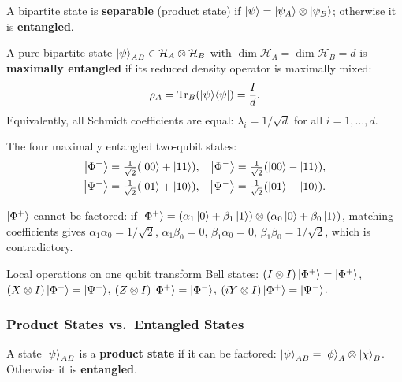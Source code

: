 \documentclass[10pt,a4paper]{article}
\begin{document}
\begin{tcolorbox}[defstyle, title={Definition: Separable and Entangled States}]
A bipartite state is \textbf{separable} (product state) if $\ket{\psi}=\ket{\psi_A}\otimes\ket{\psi_B}$; otherwise it is \textbf{entangled}.
\end{tcolorbox}

\begin{tcolorbox}[defstyle, title={Definition: Maximally Entangled State}]
A pure bipartite state $\ket{\psi}_{AB}\in\mathcal{H}_A\otimes\mathcal{H}_B$ with $\dim\mathcal{H}_A=\dim\mathcal{H}_B=d$ is \textbf{maximally entangled} if its reduced density operator is maximally mixed:
\[
\rho_A = \mathrm{Tr}_B\!\left(\ket{\psi}\!\bra{\psi}\right) = \frac{I}{d}.
\]
Equivalently, all Schmidt coefficients are equal: $\lambda_i=1/\sqrt{d}$ for all $i=1,\dots,d$.
\end{tcolorbox}

\begin{tcolorbox}[defstyle, title={Definition: Bell States (EPR Pairs)}]
The four maximally entangled two-qubit states:
\begin{align*}
\ket{\Phi^+}&=\tfrac{1}{\sqrt{2}}(\ket{00}+\ket{11}), & \ket{\Phi^-}&=\tfrac{1}{\sqrt{2}}(\ket{00}-\ket{11}),\\
\ket{\Psi^+}&=\tfrac{1}{\sqrt{2}}(\ket{01}+\ket{10}), & \ket{\Psi^-}&=\tfrac{1}{\sqrt{2}}(\ket{01}-\ket{10}).
\end{align*}
\end{tcolorbox}
$\ket{\Phi^+}$ cannot be factored: if $\ket{\Phi^+}=(\alpha_1\ket{0}+\beta_1\ket{1})\otimes(\alpha_0\ket{0}+\beta_0\ket{1})$, matching coefficients gives $\alpha_1\alpha_0=1/\sqrt{2}$, $\alpha_1\beta_0=0$, $\beta_1\alpha_0=0$, $\beta_1\beta_0=1/\sqrt{2}$, which is contradictory.

Local operations on one qubit transform Bell states: $(I\otimes I)\ket{\Phi^+}=\ket{\Phi^+}$, $(X\otimes I)\ket{\Phi^+}=\ket{\Psi^+}$, $(Z\otimes I)\ket{\Phi^+}=\ket{\Phi^-}$, $(iY\otimes I)\ket{\Phi^+}=\ket{\Psi^-}$.

\subsubsection*{Product States vs.\ Entangled States}

\begin{tcolorbox}[defstyle, title={Definition: Product (Separable) States}]
A state $\ket{\psi}_{AB}$ is a \textbf{product state} if it can be factored: $\ket{\psi}_{AB}=\ket{\phi}_A\otimes\ket{\chi}_B$. Otherwise it is \textbf{entangled}.
\end{tcolorbox}
\end{document}
